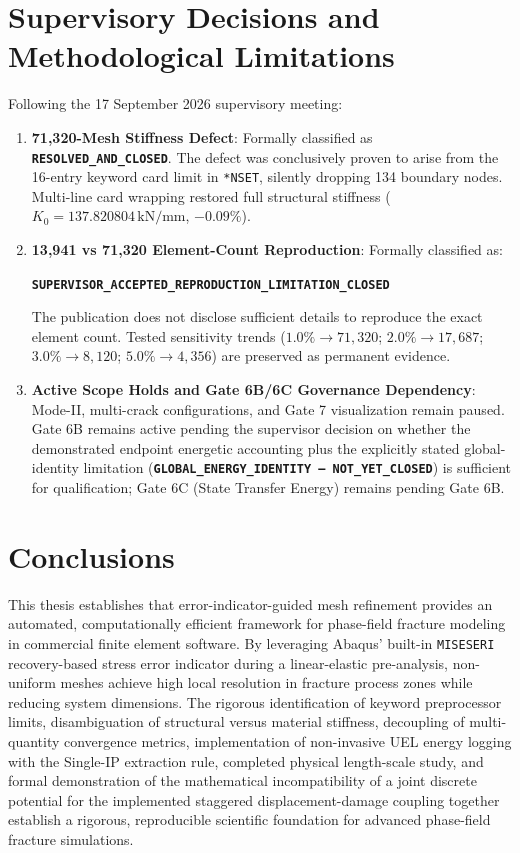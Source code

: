 \section{Supervisory Decisions and Methodological Limitations}
\label{sec:synthesis_limitations}

Following the 17 September 2026 supervisory meeting:
\begin{enumerate}
    \item \textbf{71,320-Mesh Stiffness Defect}: Formally classified as \textbf{\texttt{RESOLVED\_AND\_CLOSED}}. The defect was conclusively proven to arise from the 16-entry keyword card limit in \texttt{*NSET}, silently dropping 134 boundary nodes. Multi-line card wrapping restored full structural stiffness ($K_0 = 137.820804\,\text{kN/mm}$, $-0.09\%$).
    \item \textbf{13,941 vs 71,320 Element-Count Reproduction}: Formally classified as:
    \begin{center}
      \textbf{\texttt{SUPERVISOR\_ACCEPTED\_REPRODUCTION\_LIMITATION\_CLOSED}}
    \end{center}
    The publication does not disclose sufficient details to reproduce the exact element count. Tested sensitivity trends ($1.0\% \to 71{,}320$; $2.0\% \to 17{,}687$; $3.0\% \to 8{,}120$; $5.0\% \to 4{,}356$) are preserved as permanent evidence.
    \item \textbf{Active Scope Holds and Gate 6B/6C Governance Dependency}: Mode-II, multi-crack configurations, and Gate 7 visualization remain paused. Gate 6B remains active pending the supervisor decision on whether the demonstrated endpoint energetic accounting plus the explicitly stated global-identity limitation (\textbf{\texttt{GLOBAL\_ENERGY\_IDENTITY --- NOT\_YET\_CLOSED}}) is sufficient for qualification; Gate 6C (State Transfer Energy) remains pending Gate 6B.
\end{enumerate}

\section{Conclusions}
\label{sec:synthesis_conclusion}

This thesis establishes that error-indicator-guided mesh refinement provides an automated, computationally efficient framework for phase-field fracture modeling in commercial finite element software. By leveraging Abaqus' built-in \texttt{MISESERI} recovery-based stress error indicator during a linear-elastic pre-analysis, non-uniform meshes achieve high local resolution in fracture process zones while reducing system dimensions. The rigorous identification of keyword preprocessor limits, disambiguation of structural versus material stiffness, decoupling of multi-quantity convergence metrics, implementation of non-invasive UEL energy logging with the Single-IP extraction rule, completed physical length-scale study, and formal demonstration of the mathematical incompatibility of a joint discrete potential for the implemented staggered displacement-damage coupling together establish a rigorous, reproducible scientific foundation for advanced phase-field fracture simulations.
